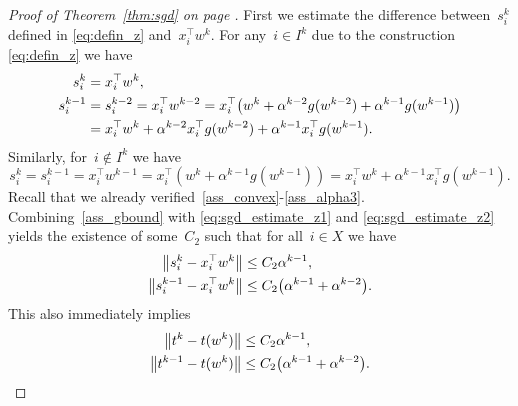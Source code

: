\begin{proof}[Proof of Theorem~\ref{thm:sgd} on page \pageref{thm:sgd}]
  First we estimate the difference between~$s_i^k$ defined in \eqref{eq:defin_z} and~$x_i^\top w^k$. For any~$i\in I^k$ due to the construction \eqref{eq:defin_z} we have
  \begin{equation}\label{eq:sgd_estimate_z1}
    \begin{aligned}
      s_i^k
      & = x_i^\top w^k, \\
      s_i^{k-1}
      & = s_i^{k-2} = x_i^\top w^{k-2}
        = x_i^\top \Brac{w^k + \alpha^{k-2}g(w^{k-2}) + \alpha^{k-1}g(w^{k-1})} \\
      & = x_i^\top w^k + \alpha^{k-2}x_i^\top g(w^{k-2}) + \alpha^{k-1}x_i^\top g(w^{k-1}).
    \end{aligned}
  \end{equation}
  Similarly, for~$i\notin I^k$ we have
  \begin{equation}\label{eq:sgd_estimate_z2}
    s_i^k
    = s_i^{k-1}
    = x_i^\top w^{k-1}
    = x_i^\top (w^k+\alpha^{k-1}g(w^{k-1}))
    = x_i^\top w^k + \alpha^{k-1}x_i^\top g(w^{k-1}).
  \end{equation}
  Recall that we already verified~\ref{ass_convex}-\ref{ass_alpha3}. Combining~\ref{ass_gbound} with \eqref{eq:sgd_estimate_z1} and \eqref{eq:sgd_estimate_z2} yields the existence of some~$C_2$ such that for all~$i\in X$ we have
  \begin{equation}\label{eq:estimate_diff_z}
    \begin{aligned}
      \nrm{s_i^k - x_i^\top w^k} &\le C_2\alpha^{k-1}, \\
      \nrm{s_i^{k-1} - x_i^\top w^k} &\le C_2\Brac{\alpha^{k-1}+\alpha^{k-2}}. \\
    \end{aligned}
  \end{equation}
  This also immediately implies
  \begin{equation}\label{eq:estimate_diff_t}
    \begin{aligned}
      \nrm{t^k - t(w^k)}     & \le C_2\alpha^{k-1}, \\
      \nrm{t^{k-1} - t(w^k)} & \le C_2\Brac{\alpha^{k-1}+\alpha^{k-2}}. \\
    \end{aligned}
  \end{equation}


\end{proof}
